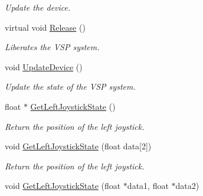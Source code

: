 \begin{DoxyCompactItemize}
\begin{DoxyCompactList}\small\item\em Update the device. \item\end{DoxyCompactList}\item 
\hypertarget{classvtkVSP_a91bfd5c41c807ab1dcbff59ff56a4d72}{
virtual void \hyperlink{classvtkVSP_a91bfd5c41c807ab1dcbff59ff56a4d72}{Release} ()}
\label{classvtkVSP_a91bfd5c41c807ab1dcbff59ff56a4d72}

\begin{DoxyCompactList}\small\item\em Liberates the VSP system. \item\end{DoxyCompactList}\item 
\hypertarget{classvtkVSP_a421a984e61da77184fc1e1c0eedd5956}{
void \hyperlink{classvtkVSP_a421a984e61da77184fc1e1c0eedd5956}{UpdateDevice} ()}
\label{classvtkVSP_a421a984e61da77184fc1e1c0eedd5956}

\begin{DoxyCompactList}\small\item\em Update the state of the VSP system. \item\end{DoxyCompactList}\item 
\hypertarget{classvtkVSP_a18aefac07bea39778d9965de22665111}{
float $\ast$ \hyperlink{classvtkVSP_a18aefac07bea39778d9965de22665111}{GetLeftJoystickState} ()}
\label{classvtkVSP_a18aefac07bea39778d9965de22665111}

\begin{DoxyCompactList}\small\item\em Return the position of the left joystick. \item\end{DoxyCompactList}\item 
\hypertarget{classvtkVSP_a706f76c150a0de378fbf86e9bc44e0f4}{
void \hyperlink{classvtkVSP_a706f76c150a0de378fbf86e9bc44e0f4}{GetLeftJoystickState} (float data\mbox{[}2\mbox{]})}
\label{classvtkVSP_a706f76c150a0de378fbf86e9bc44e0f4}

\begin{DoxyCompactList}\small\item\em Return the position of the left joystick. \item\end{DoxyCompactList}\item 
\hypertarget{classvtkVSP_a55af41bd4362fe00025d9a90aea7f088}{
void \hyperlink{classvtkVSP_a55af41bd4362fe00025d9a90aea7f088}{GetLeftJoystickState} (float $\ast$data1, float $\ast$data2)}
\label{classvtkVSP_a55af41bd4362fe00025d9a90aea7f088}


\end{DoxyCompactItemize}
